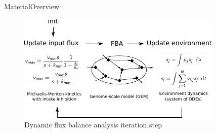 \documentclass{beamer}
\begin{document}
\begin{frame}{Material}{Overview}

\begin{figure}[!h]
\includegraphics[width=\linewidth]{Img/dfba.pdf}
\caption{Dynamic flux balance analysis iteration step}
\label{fig:dfba}
\end{figure}

% 
  
\end{frame}
\end{document}
